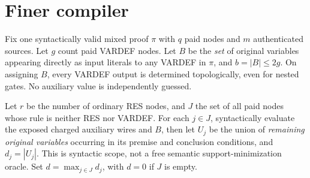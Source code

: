 \documentclass[11pt]{article}
\begin{document}
\section*{Finer compiler}
Fix one syntactically valid mixed proof $\pi$ with $q$ paid nodes and $m$ authenticated sources. Let $g$ count paid VARDEF nodes. Let $B$ be the \emph{set} of original variables appearing directly as input literals to any VARDEF in $\pi$, and $b=|B|\le 2g$. On assigning $B$, every VARDEF output is determined topologically, even for nested gates. No auxiliary value is independently guessed.

Let $r$ be the number of ordinary RES nodes, and $J$ the set of all paid nodes whose rule is neither RES nor VARDEF. For each $j\in J$, syntactically evaluate the exposed charged auxiliary wires and $B$, then let $U_j$ be the union of \emph{remaining original variables} occurring in its premise and conclusion conditions, and $d_j=|U_j|$. This is syntactic scope, not a free semantic support-minimization oracle. Set $d=\max_{j\in J}d_j$, with $d=0$ if $J$ is empty.
\end{document}
